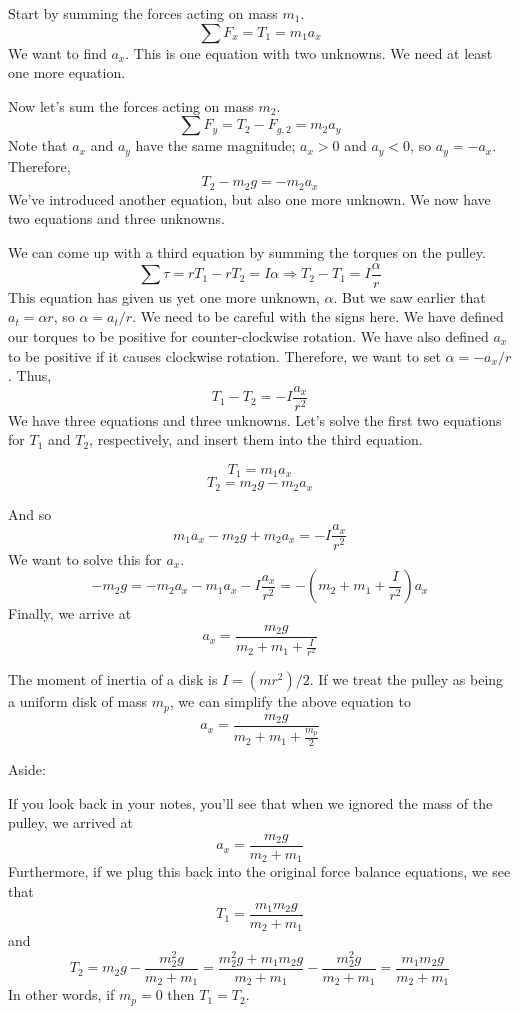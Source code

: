 \vspace{8cm}


Start by summing the forces acting on mass $m_1$.
\begin{equation}\sum F_x=T_1=m_1a_x\end{equation}
We want to find $a_x$. 
This is one equation with two unknowns. We need at least one more equation.

Now let's sum the forces acting on mass $m_2$.
$$\sum F_y=T_2-F_{g,2}=m_2a_y$$
Note that $a_x$ and $a_y$ have the same magnitude; $a_x>0$ and $a_y<0$, so $a_y=-a_x$. Therefore,
\begin{equation}T_2-m_2g=-m_2a_x\end{equation}
We've introduced another equation, but also one more unknown. We now have two equations and three unknowns.

We can come up with a third equation by summing the torques on the pulley.
$$\sum \tau=rT_1-rT_2=I\alpha\Rightarrow T_2-T_1=I\frac{\alpha}{r}$$
This equation has given us yet one more unknown, $\alpha$. But we saw earlier that $a_t=\alpha r$, so $\alpha=a_t/r$. We need to be careful with the signs here. We have defined our torques to be positive for counter-clockwise rotation. We have also defined $a_x$ to be positive if it causes clockwise rotation. Therefore, we want to set $\alpha=-a_x/r$. Thus,
\begin{equation}T_1-T_2=-I\frac{a_x}{r^2}\end{equation}
We have three equations and three unknowns. Let's solve the first two equations for $T_1$ and $T_2$, respectively, and insert them into the third equation.

$$T_1=m_1a_x$$
$$T_2=m_2g-m_2a_x$$

And so
$$m_1a_x-m_2g+m_2a_x=-I\frac{a_x}{r^2}$$
We want to solve this for $a_x$.
$$-m_2g=-m_2a_x-m_1a_x-I\frac{a_x}{r^2}=-\left(m_2+m_1+\frac{I}{r^2}\right)a_x$$
Finally, we arrive at
$${a_x=\frac{m_2g}{m_2+m_1+\frac{I}{r^2}}}$$

The moment of inertia of a disk is $I=(mr^2)/2$. If we treat the pulley as being a uniform disk of mass $m_p$, we can simplify the above equation to 
\begin{equation}\boxed{a_x=\frac{m_2g}{m_2+m_1+\frac{m_p}{2}}}\end{equation}

Aside:

If you look back in your notes, you'll see that when we ignored the mass of the pulley, we arrived at
$$a_x=\frac{m_2g}{m_2+m_1}$$
Furthermore, if we plug this back into the original force balance equations, we see that 
$$T_1=\frac{m_1m_2g}{m_2+m_1}$$
and
$$T_2=m_2g-\frac{m_2^2g}{m_2+m_1}=\frac{m_2^2g+m_1m_2g}{m_2+m_1}-\frac{m_2^2g}{m_2+m_1}=\frac{m_1m_2g}{m_2+m_1}$$
In other words, if $m_p=0$ then $T_1=T_2$.

